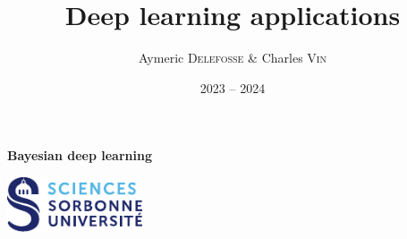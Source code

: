 \documentclass{report}
\title{Deep learning applications}
\author{Aymeric \textsc{Delefosse} \& Charles \textsc{Vin}}
\date{2023 -- 2024}
\theoremstyle{plain}%
\theoremstyle{definition}
\theoremstyle{remark}
\begin{document}
\begin{titlepage}
    \centering
    
    \vspace*{\fill}
    \Huge \thetitle \par
    \vspace{2mm}
    \Large \textbf{Bayesian deep learning} \par
    \vspace{2mm}

    \Large \theauthor \par
    \vspace{2mm}
    \large \thedate \par
    
    \vfill
    
    \includegraphics[width=0.3\textwidth]{../figs/sorbonne-science.pdf}
    
\end{titlepage}

\tableofcontents
\newpage







\end{document}
